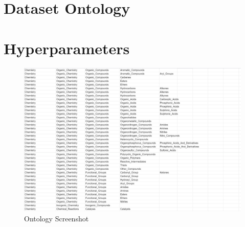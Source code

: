 \documentclass[11pt]{article}
\begin{document}



\appendix



 \section{Dataset Ontology}

\label{sec:appendix1}


\section{Hyperparameters}

\label{appendix2}


\begin{figure}[ht]
	\begin{center}
		\centerline{\includegraphics[width=2 
			\columnwidth]{ont.jpg}}
		\caption{Ontology Screenshot}
		\label{fig:ont}
	\end{center}
\end{figure}
\end{document}
